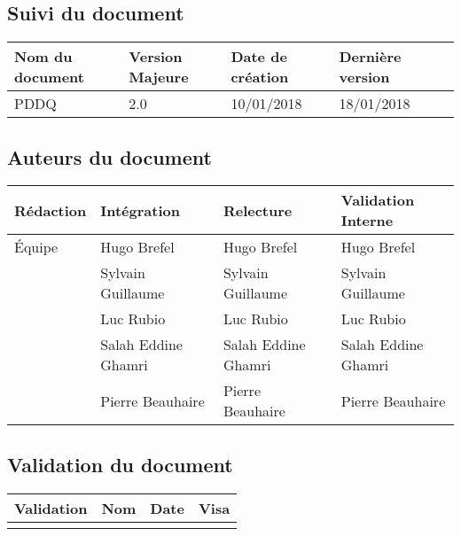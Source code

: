 \documentclass[10pt,a4paper]{article}
\begin{document}
\newpage


\subsection*{Suivi du document}

\begin{center}
    \begin{tabular}{| l | l | l | l | l |}
    \hline
     \rowcolor{gray} Nom du document & Version Majeure & Date de création & Dernière version \\ \hline
    PDDQ & 2.0 & 10/01/2018 & 18/01/2018 \\ \hline
    \end{tabular}
\end{center}


\subsection*{Auteurs du document}

\begin{center}
    \begin{tabular}{| l | l | l | l |}
    \hline
    \rowcolor{gray} Rédaction & Intégration & Relecture & Validation Interne \\ \hline
    Équipe & Hugo Brefel & Hugo Brefel & Hugo Brefel \\ 
     & Sylvain Guillaume & Sylvain Guillaume & Sylvain Guillaume \\
     & Luc Rubio & Luc Rubio & Luc Rubio \\
     & Salah Eddine Ghamri & Salah Eddine Ghamri & Salah Eddine Ghamri \\
     & Pierre Beauhaire & Pierre Beauhaire & Pierre Beauhaire \\ \hline
    \end{tabular}
\end{center}

\subsection*{Validation du document}

\begin{center}
    \begin{tabular}{| l | l | l | l |}
    \hline
     \rowcolor{gray} Validation & Nom & Date & Visa \\ \hline
    & & & \\
     \hline
    \end{tabular}
\end{center}
\end{document}
